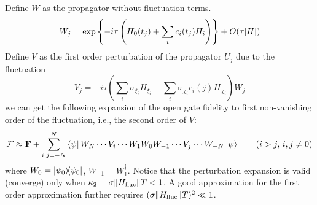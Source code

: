 \documentclass{notes2}
\newcommand{\closef}{\mathbf{F}}
\newcommand{\openf}{\mathcal{F}}
\begin{document}
Define $W$ as the propagator without fluctuation terms.
\begin{equation}
    W_j = \exp\left\{-i\tau \left(H_0(t_j) + \sum_{i} c_i(t_j) H_i \right)\right\} + O(\tau \abs{H})
\end{equation}
Define $V$ as  the first order perturbation of the propagator $U_j$ due to the fluctuation
\begin{equation}
V_j = -i\tau(\sum_i\sigma_{\xi_i} H_{\xi_i}+ \sum_i\sigma_{\chi_i} c_i(j) H_{\chi_i}) W_j
\end{equation} 
we can get the following expansion of the open gate fidelity to first non-vanishing order of the fluctuation, i.e., the second order of $V$:
\begin{equation}
    \openf \approx \closef + \sum_{i,j=-N}^N \bra{\psi} W_{N} \cdots V_{i} \cdots W_1 W_0 W_{-1} \cdots V_j \cdots W_{-N} \ket{\psi}\qquad (i>j,\, i,j\neq 0)
    \label{eq:fluc_expansion_a}
\end{equation}
where $W_0 = \ketbra{\psi_0}$, $W_{-1} = W_{1}^\dagger$. Notice that the perturbation expansion is valid (converge) only when $\kappa_2 = \sigma\norm{H_{\text{fluc}}} T < 1$. A good approximation for the first order approximation further requires $(\sigma\norm{H_{\text{fluc}}} T)^2 \ll 1$.
\end{document}
